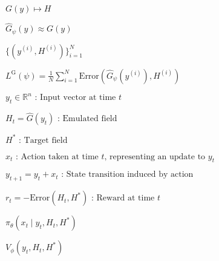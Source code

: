 \documentclass[multi={mymath},border=1pt,convert={convertexe={convert},density=300,size=800x800,outext=.png}]{standalone}
\newenvironment{mymath}{$\displaystyle}{$}
\begin{document}
\begin{mymath}
  G(y) \mapsto H
\end{mymath}

\begin{mymath}
  \hat{G}_{\psi}(y) \approx G(y)
\end{mymath}

\begin{mymath}
  \{(y^{(i)}, H^{(i)})\}_{i=1}^N
\end{mymath}

\begin{mymath}
  L^{\text{G}}(\psi) = \frac{1}{N} \sum_{i=1}^N \text{Error}(\hat{G}_\psi(y^{(i)}), H^{(i)})
\end{mymath}

\begin{mymath}
  y_t \in \mathbb{R}^n \textrm{ : Input vector at time } t
\end{mymath}

\begin{mymath}
  H_t = \hat{G}(y_t) \textrm{ : Emulated field}
\end{mymath}

\begin{mymath}
  H^* \textrm{ : Target field}
\end{mymath}

\begin{mymath}
  x_t \textrm{ : Action taken at time } t \textrm{, representing an update to } y_t
\end{mymath}

\begin{mymath}
  y_{t+1} = y_t + x_t \textrm{ : State transition induced by action}
\end{mymath}

\begin{mymath}
  r_t = -\text{Error}(H_t, H^*) \textrm{ : Reward at time } t
\end{mymath}

\begin{mymath}
  \pi_\theta(x_t \mid y_t, H_t, H^*)
\end{mymath}

\begin{mymath}
  V_\phi(y_t, H_t, H^*)
\end{mymath}
\end{document}
